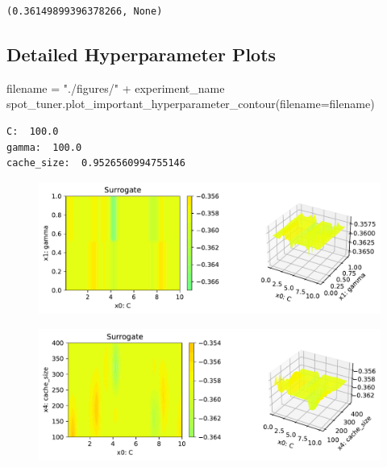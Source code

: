 \documentclass[
  letterpaper,
  DIV=11,
  numbers=noendperiod]{scrreprt}
\newenvironment{Shaded}{\begin{snugshade}}{\end{snugshade}}
\newcommand{\NormalTok}[1]{\textcolor[rgb]{0.00,0.23,0.31}{#1}}
\newcommand{\OperatorTok}[1]{\textcolor[rgb]{0.37,0.37,0.37}{#1}}
\newcommand{\StringTok}[1]{\textcolor[rgb]{0.13,0.47,0.30}{#1}}
\begin{document}
\begin{verbatim}
(0.36149899396378266, None)
\end{verbatim}

\hypertarget{detailed-hyperparameter-plots-5}{%
\subsection{Detailed Hyperparameter
Plots}\label{detailed-hyperparameter-plots-5}}

\begin{Shaded}
\begin{Highlighting}[]
\NormalTok{filename }\OperatorTok{=} \StringTok{"./figures/"} \OperatorTok{+}\NormalTok{ experiment\_name}
\NormalTok{spot\_tuner.plot\_important\_hyperparameter\_contour(filename}\OperatorTok{=}\NormalTok{filename)}
\end{Highlighting}
\end{Shaded}

\begin{verbatim}
C:  100.0
gamma:  100.0
cache_size:  0.9526560994755146
\end{verbatim}

\begin{figure}[H]

{\centering \includegraphics{18_spot_hpt_sklearn_multiclass_classification_svc_files/figure-pdf/cell-47-output-2.pdf}

}

\end{figure}

\begin{figure}[H]

{\centering \includegraphics{18_spot_hpt_sklearn_multiclass_classification_svc_files/figure-pdf/cell-47-output-3.pdf}

}

\end{figure}
\end{document}
